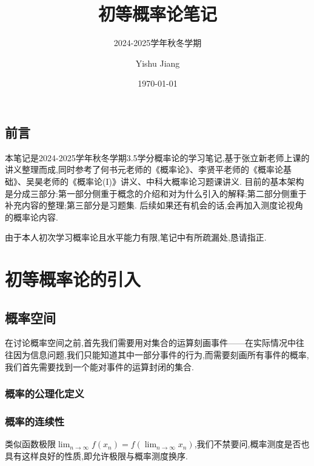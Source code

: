 \documentclass[lang=cn,10pt]{elegantbook}
\title{初等概率论笔记}
\subtitle{2024-2025学年秋冬学期}
\author{Yishu Jiang}
\institute{School of Economics,Zhejiang University}
\date{\today}
\begin{document}
\maketitle
\frontmatter
\chapter*{前言}
{\fangsong 
    本笔记是2024-2025学年秋冬学期3.5学分概率论的学习笔记,基于张立新老师上课的讲义整理而成,同时参考了何书元老师的《概率论》、李贤平老师的《概率论基础》、吴昊老师的《概率论(I)》讲义、中科大概率论习题课讲义.
    目前的基本架构是分成三部分:第一部分侧重于概念的介绍和对为什么引入的解释;第二部分侧重于补充内容的整理;第三部分是习题集.
    后续如果还有机会的话,会再加入测度论视角的概率论内容.

    由于本人初次学习概率论且水平能力有限,笔记中有所疏漏处,恳请指正.
}
\newpage

\tableofcontents

\mainmatter

\part{初等概率论的引入}
\chapter{概率空间}
在讨论概率空间之前,首先我们需要用对集合的运算刻画事件——在实际情况中往往因为信息问题,我们只能知道其中一部分事件的行为,而需要刻画所有事件的概率,我们首先需要找到一个能对事件的运算封闭的集合.
\section{概率的公理化定义}
\section{概率的连续性}
类似函数极限$\lim_{n\to\infty}f(x_n)=f(\lim_{n\to\infty}x_n)$,我们不禁要问,概率测度是否也具有这样良好的性质,即允许极限与概率测度换序.
\end{document}
